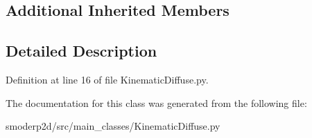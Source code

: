 \subsection*{Additional Inherited Members}


\subsection{Detailed Description}


Definition at line 16 of file Kinematic\-Diffuse.\-py.



The documentation for this class was generated from the following file\-:\begin{DoxyCompactItemize}
\item 
smoderp2d/src/main\-\_\-classes/Kinematic\-Diffuse.\-py\end{DoxyCompactItemize}

